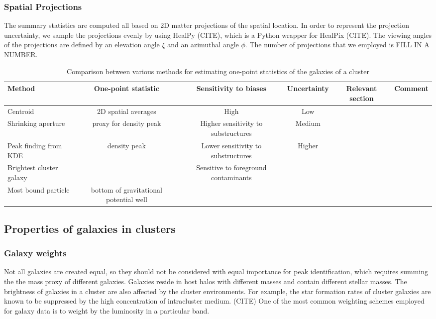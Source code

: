 \subsubsection{Spatial Projections}
The summary statistics are computed all based on 2D matter projections of the
spatial location.
In order to represent the projection uncertainty, we sample the projections evenly
by using HealPy (CITE), which is a Python wrapper for HealPix (CITE).
The viewing angles of the projections are defined by an elevation angle
$\xi$ and an azimuthal angle $\phi$. 
The number of projections that we employed is FILL IN A NUMBER.

\begin{table*}
\begin{center}
\begin{minipage}{180mm} 
	\caption{Comparison between various methods for estimating one-point
		statistics of the galaxies of a cluster 
\label{tab:centroid_comparison}} 
	\begin{tabular}{@{}lccccc@{}}
\hline 
Method &  One-point statistic & Sensitivity to biases & Uncertainty  & Relevant
section & Comment  \\ \hline
Centroid & 2D spatial averages & High & Low & \\
Shrinking aperture & proxy for density peak & Higher sensitivity to substructures & Medium
& \\
Peak finding from KDE & density peak & Lower sensitivity to substructures &
Higher & \\
Brightest cluster galaxy & & Sensitive to foreground contaminants & \\ 
Most bound particle & bottom of gravitational potential well &  & 
&  \\
\hline
\end{tabular} 
\label{tab:summary_stat_info} 
\end{minipage}
\end{center} 
\end{table*}
\subsection{Properties of galaxies in clusters}
\subsubsection{Galaxy weights}
\label{subsubsec:galaxy_weights}
Not all galaxies are created equal, so they should not be considered with equal
importance for peak identification, which requires summing the
the mass proxy of different galaxies. Galaxies reside in host halos with different masses and 
contain different stellar masses. The brightness of galaxies in a cluster are 
also affected by the cluster environments.
For example, the star formation rates of cluster galaxies are known to be 
suppressed by the high concentration of intracluster medium. (CITE)
One of the most common weighting schemes employed for galaxy data is to weight
by the luminosity in a particular band.


